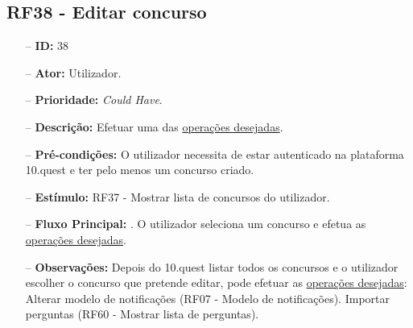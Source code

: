 \subsection{RF38 - Editar concurso}
\begin{itemize}
	\item[--] \textbf{ID:} 38
	\item[--]  \textbf{Ator:} Utilizador.
	\item[--]  \textbf{Prioridade:} \textit{Could Have}.
	\item[--]  \textbf{Descrição:} Efetuar uma das \underline{operações desejadas}.
	\item[--]  \textbf{Pré-condições:} O utilizador necessita de estar autenticado na plataforma 10.quest e ter pelo menos um concurso criado.
	\item[--]  \textbf{Estímulo:} RF37 - Mostrar lista de concursos do utilizador.
	\item[--]  \textbf{Fluxo Principal:} 
		. O utilizador seleciona um concurso e efetua as \underline{operações desejadas}.
	\item[--]  \textbf{Observações:} Depois do 10.quest listar todos os concursos e o utilizador escolher o concurso que pretende editar, pode efetuar as \underline{operações desejadas}:
		\subitem Alterar modelo de notificações (RF07 - Modelo de notificações).
		\subitem Importar perguntas (RF60 - Mostrar lista de perguntas).
\end{itemize}
\newpage

